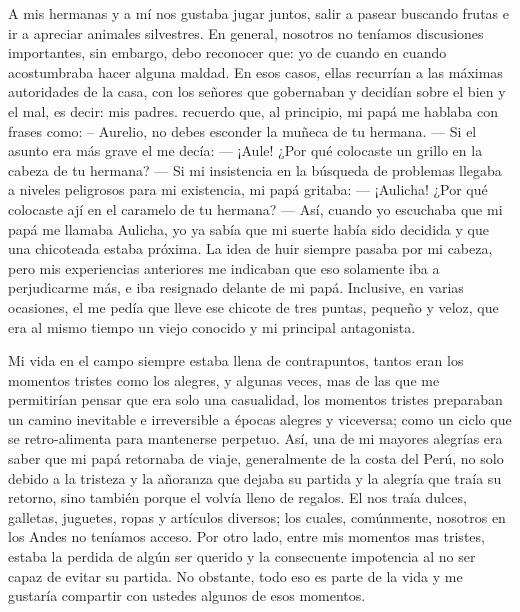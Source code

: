 A mis hermanas y a mí nos gustaba jugar juntos, salir a pasear buscando frutas e ir a apreciar animales silvestres. En general, nosotros no teníamos discusiones importantes, sin embargo, debo reconocer que: yo de cuando en cuando acostumbraba hacer alguna maldad.
En esos casos, ellas recurrían a las máximas autoridades de la casa, con los señores que gobernaban y decidían sobre el bien y el mal, es decir: mis padres. 
recuerdo que, al principio, mi papá me hablaba con frases como: 
-- Aurelio, no debes esconder la muñeca de tu hermana. --- 
Si el asunto era más grave el me decía: 
--- ¡Aule! ¿Por qué colocaste un grillo en la cabeza de tu hermana? --- 
Si mi insistencia en la búsqueda de problemas llegaba a niveles peligrosos para mi existencia, mi papá gritaba: 
--- ¡Aulicha! ¿Por qué colocaste ají en el caramelo de tu hermana? ---
Así, cuando yo escuchaba que mi papá me llamaba Aulicha, yo ya sabía que mi suerte había sido decidida y que una chicoteada estaba próxima. La idea de huir siempre pasaba por mi cabeza, pero mis experiencias anteriores me indicaban que eso solamente iba a perjudicarme más, e iba resignado delante de mi papá. Inclusive, en varias ocasiones, el me pedía que lleve ese chicote de tres puntas, pequeño y veloz, que era al mismo tiempo un viejo conocido y mi principal antagonista. 

Mi vida en el campo siempre estaba llena de contrapuntos, tantos eran los momentos tristes como los alegres, y  algunas veces, mas de las que me permitirían pensar que era solo una casualidad, los momentos tristes preparaban un camino inevitable e irreversible a épocas alegres y viceversa; como un ciclo que se retro-alimenta para mantenerse perpetuo.
Así, una de mi mayores alegrías era saber que mi papá retornaba de viaje, generalmente de la costa del Perú, no solo debido a la tristeza y la añoranza que dejaba su partida y la alegría que traía su retorno, sino también porque el volvía lleno de regalos. 
El nos traía dulces, galletas, juguetes, ropas y artículos diversos; los cuales, comúnmente, nosotros en los Andes no teníamos acceso.
Por otro lado, entre mis momentos mas tristes, estaba la perdida de algún ser querido y la consecuente impotencia al no ser capaz de evitar su partida.
No obstante, todo eso es parte de la vida y me gustaría compartir con ustedes algunos de esos momentos.






